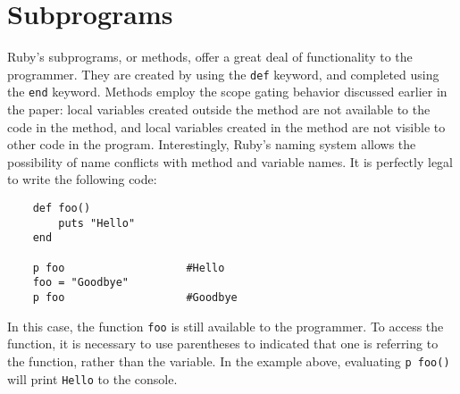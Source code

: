 \documentclass[12pt]{article}
\begin{document}
\section{Subprograms}
Ruby's subprograms, or methods, offer a great deal of functionality to the programmer. They are created by using the \verb|def| keyword, and completed using the \verb|end| keyword. Methods employ the scope gating behavior discussed earlier in the paper: local variables created outside the method are not available to the code in the method, and local variables created in the method are not visible to other code in the program\cite{calvin_labs}\cite{learn_co}. Interestingly, Ruby's naming system allows the possibility of name conflicts with method and variable names. It is perfectly legal to write the following code:
\begin{lstlisting}
    def foo()  
        puts "Hello"
    end
    
    p foo                   #Hello 
    foo = "Goodbye"
    p foo                   #Goodbye
\end{lstlisting}
In this case, the function \verb|foo| is still available to the programmer. To access the function, it is necessary to use parentheses to indicated that one is referring to the function, rather than the variable. In the example above, evaluating \verb|p foo()| will print \verb|Hello| to the console\cite{darko}.
\end{document}
